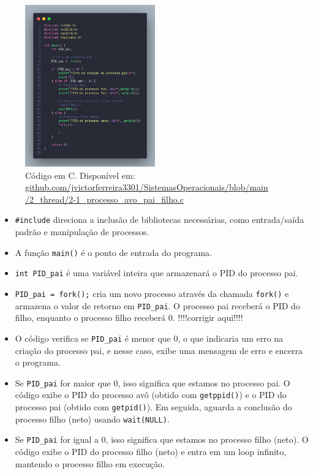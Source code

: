 \documentclass[
	12pt,				%
	openright,			%
	oneside,			%
	a4paper,			%
	chapter=TITLE,		%
	english,			%
	french,				%
	spanish,			%
	brazil				%
	]{abntex2}
\theoremstyle{definition}
\begin{document}
\begin{figure}
    \centering
    \includegraphics[width=0.5\textwidth]{imagens/processos_1.png}
	\caption{Código em C. Disponível em: \href{https://github.com/jvictorferreira3301/Sistemas_Operacionais/blob/main/2_thread/2-1_processo_avo_pai_filho.c}{github.com/jvictorferreira3301/SistemasOperacionais/blob/main
    /2\_thread/2-1\_processo\_avo\_pai\_filho.c}}
	\label{fig:proc1}
\end{figure}


\begin{itemize}
    \item \texttt{\#include} direciona a inclusão de bibliotecas necessárias, como entrada/saída padrão e manipulação de processos.
    \item A função \texttt{main()} é o ponto de entrada do programa.
    \item \texttt{int PID\_pai} é uma variável inteira que armazenará o PID do processo pai.
    \item \texttt{PID\_pai = fork();} cria um novo processo através da chamada \texttt{fork()} e armazena o valor de retorno em \texttt{PID\_pai}. O processo pai receberá o PID do filho, enquanto o processo filho receberá 0. !!!!corrigir aqui!!!!
    \item O código verifica se \texttt{PID\_pai} é menor que 0, o que indicaria um erro na criação do processo pai, e nesse caso, exibe uma mensagem de erro e encerra o programa.
    \item Se \texttt{PID\_pai} for maior que 0, isso significa que estamos no processo pai. O código exibe o PID do processo avô (obtido com \texttt{getppid()}) e o PID do processo pai (obtido com \texttt{getpid()}). Em seguida, aguarda a conclusão do processo filho (neto) usando \texttt{wait(NULL)}.
    \item Se \texttt{PID\_pai} for igual a 0, isso significa que estamos no processo filho (neto). O código exibe o PID do processo filho (neto) e entra em um loop infinito, mantendo o processo filho em execução.
\end{itemize}
\end{document}
